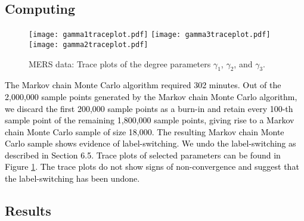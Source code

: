 \documentclass[12pt,usenatbib,referee]{article}
\renewcommand{\alert}{\textcolor{black}}
\begin{document}
\alert{}

\subsection{Computing} 


\begin{figure}[t]
\caption{\label{traceplots}MERS data: Trace plots of the degree parameters $\gamma_1$, $\gamma_2$, and $\gamma_3$.}\s
\begin{center}
\texttt{[image: gamma1traceplot.pdf]}
\texttt{[image: gamma3traceplot.pdf]}
\texttt{[image: gamma2traceplot.pdf]}
\end{center}
\end{figure}

\alert{The Markov chain Monte Carlo algorithm required 302 minutes.
Out of the 2,000,000 sample points generated by the Markov chain Monte Carlo algorithm,
we discard the first 200,000 sample points as a burn-in and retain every 100-th sample point of the remaining 1,800,000 sample points,
giving rise to a Markov chain Monte Carlo sample of size 18,000.
The resulting Markov chain Monte Carlo sample shows evidence of label-switching.
We undo the label-switching as described in Section 6.5.
Trace plots of selected parameters can be found in Figure \ref{traceplots}.
The trace plots do not show signs of non-convergence and suggest that the label-switching has been undone.}

\subsection{Results} 

\end{document}
